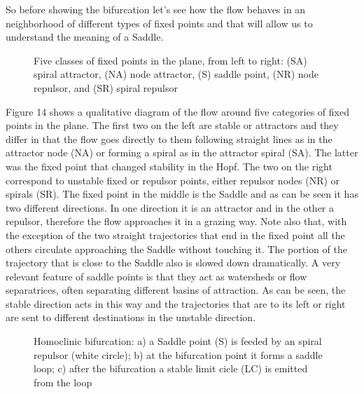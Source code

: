 \documentclass{article}
\begin{document}
So before showing the bifurcation let's see how the flow behaves in an neighborhood of different types of fixed points and that will allow us to understand the meaning of a Saddle.

\begin{figure}[h]
    \centering
    \caption{Five classes of fixed points in the plane, from left to right: (SA) spiral attractor, (NA) node attractor, (S) saddle point, (NR) node repulsor, and (SR) spiral repulsor} 
    \label{fig_homoclinic}
\end{figure}

Figure 14 shows a qualitative diagram of the flow around five categories of fixed points in the plane. 
The first two on the left are stable or attractors and they differ in that the flow goes directly to them following straight lines as in the attractor node (NA) or forming a spiral as in the attractor spiral (SA). 
The latter was the fixed point that changed stability in the Hopf. 
The two on the right correspond to unstable fixed or repulsor points, either repulsor nodes (NR) or spirals (SR). 
The fixed point in the middle is the Saddle and as can be seen it has two different directions. 
In one direction it is an attractor and in the other a repulsor, therefore the flow approaches it in a grazing way. 
Note also that, with the exception of the two straight trajectories that end in the fixed point all the others circulate approaching the Saddle without touching it. The portion of the trajectory that is close to the Saddle also is slowed down dramatically.
A very relevant feature of saddle points is that they act as watersheds or flow separatrices, often separating different basins of attraction. As can be seen, the stable direction acts in this way and the trajectories that are to its left or right are sent to different destinations in the unstable direction.

\begin{figure}[h]
    \centering
    \caption{Homoclinic bifurcation: a) a Saddle point (S) is feeded by an spiral repulsor (white circle); b) at the bifurcation point it forms a saddle loop; c) after the bifurcation a stable limit cicle (LC) is emitted from the loop} 
    \label{fig_homoclinic}
\end{figure}
\end{document}
